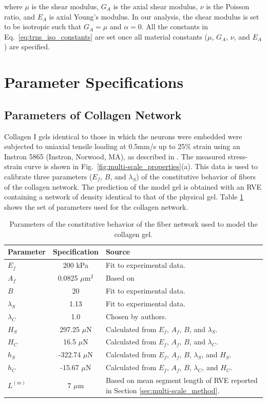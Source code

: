\documentclass[]{interact}
\begin{document}
%
where $\mu$ is the shear modulus, $G_A$ is the axial shear modulus, $\nu$ is the Poisson ratio, and $E_A$ is axial Young's modulus. In our analysis, the shear modulus is set to be isotropic such that $G_A=\mu$ and $\alpha = 0$. All the constants in Eq.\ \eqref{eq:trns_iso_constants} are set once all material constants ($\mu$, $G_A$, $\nu$, and $E_A$) are specified. 

\section{Parameter Specifications}

\subsection{Parameters of Collagen Network}
Collagen I gels identical to those in which the neurons were embedded were subjected to uniaxial tensile loading at 0.5mm/s up to 25$\%$ strain using an Instron 5865 (Instron, Norwood, MA), as described in  \cite{Zhang:2016ga}. The measured stress-strain curve is shown in Fig.\ \ref{fig:multi-scale_properties}(a). This data is used to calibrate three parameters ($E_f$, $B$, and $\lambda_S$) of the constitutive behavior of fibers of the collagen network. The prediction of the model gel is obtained with an RVE containing a network of density identical to that of the physical gel. Table \ref{table:multi-scale_parameters} shows the set of parameters used for the collagen network. 
\begin{table}[ht]
\begin{center}
\begin{tabular}{ l c l }
\hline \hline
Parameter & Specification & Source \\
\hline 
$E_f$ & 200 kPa & Fit to experimental data. \\
$A_f$ & 0.0825 $\mu$m$^2$ & Based on \cite{Dutov:2016gu} \\
$B$ & 20 & Fit to experimental data. \\
$\lambda_S$ &1.13 & Fit to experimental data. \\
$\lambda_C$ & 1.0 & Chosen by authors. \\ 
$H_S$ & 297.25 $\mu$N & Calculated from $E_f$, $A_f$, $B$, and $\lambda_S$.\\
$H_C$ & 16.5 $\mu$N & Calculated from $E_f$, $A_f$, $B$, and $\lambda_C$. \\
$h_S$ & -322.74 $\mu$N & Calculated from $E_f$, $A_f$, $B$, $\lambda_S$, and $H_S$. \\
$h_C$ & -15.67 $\mu$N & Calculated from $E_f$, $A_f$, $B$, $\lambda_C$, and $H_C$. \\
$L^{(m)}$ & 7 $\mu$m & Based on mean segment length of RVE reported in Section \ref{sec:multi-scale_method}.\\ 
\hline \hline
\end{tabular}
\end{center}
\caption{Parameters of the constitutive behavior of the fiber network used to model the collagen gel.}
\label{table:multi-scale_parameters}
\end{table}
\end{document}
